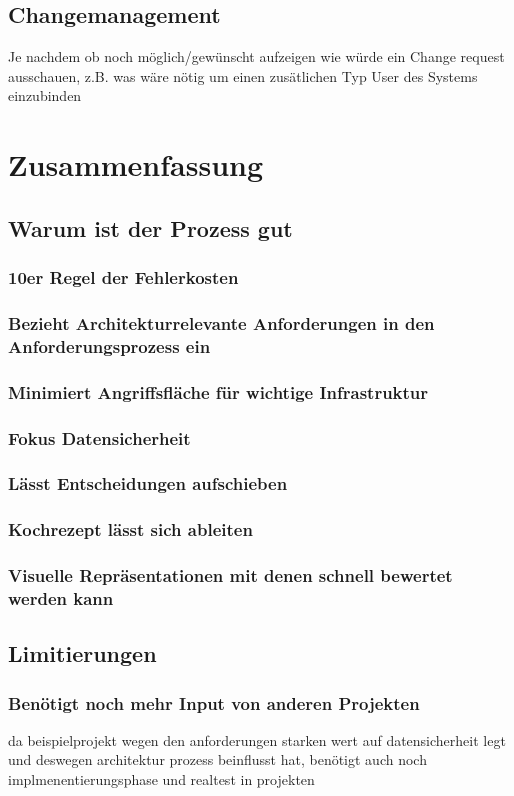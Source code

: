 \documentclass[Master,MSE,german]{twbook}
\begin{document}
\section{Changemanagement}
Je nachdem ob noch möglich/gewünscht aufzeigen wie würde ein Change request ausschauen, z.B. was wäre nötig um einen zusätlichen Typ User des Systems einzubinden


\chapter{Zusammenfassung}

\section{Warum ist der Prozess gut}
\subsection{10er Regel der Fehlerkosten}
\subsection{Bezieht Architekturrelevante Anforderungen in den Anforderungsprozess ein}
\subsection{Minimiert Angriffsfläche für wichtige Infrastruktur}
\subsection{Fokus Datensicherheit}
\subsection{Lässt Entscheidungen aufschieben}
\subsection{Kochrezept lässt sich ableiten}
\subsection{Visuelle Repräsentationen mit denen schnell bewertet werden kann}

\section{Limitierungen}
\subsection{Benötigt noch mehr Input von anderen Projekten}
da beispielprojekt wegen den anforderungen starken wert auf datensicherheit legt und deswegen architektur prozess beinflusst hat, benötigt auch noch implmenentierungsphase und realtest in projekten
\end{document}
